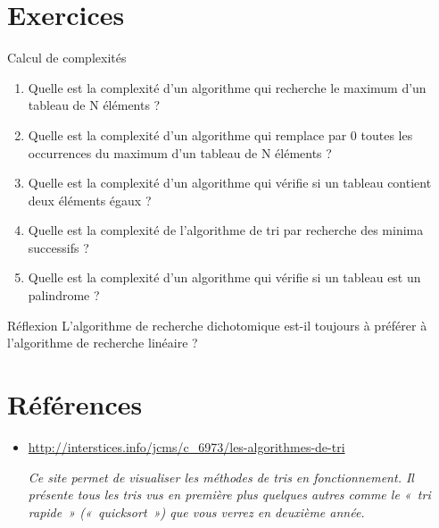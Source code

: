 \section{	Exercices}

	\begin{Exercice}{Calcul de complexités}
			
			\begin{enumerate}[label=\alph*)]
				\item 
					Quelle est la complexité d'un algorithme qui recherche
					le maximum d'un tableau de N éléments ?
				\item 
					Quelle est la complexité d'un algorithme qui remplace
					par 0 toutes les occurrences du maximum d'un tableau
					de N éléments ?
				\item 
					Quelle est la complexité d'un algorithme qui vérifie si
					un tableau contient deux éléments égaux ?
				\item 
					Quelle est la complexité de l'algorithme de tri par
					recherche des minima successifs ?
				\item 
					Quelle est la complexité d'un algorithme qui vérifie si
					un tableau est un palindrome ?
			\end{enumerate}
		\end{Exercice}
		
		\begin{Exercice}{Réflexion}
				L’algorithme de recherche dichotomique est-il toujours à préférer à
				l’algorithme de recherche linéaire ?
		\end{Exercice}


\section{Références}

	\liststyleListv
	\begin{itemize}
		\item {
			\url{http://interstices.info/jcms/c_6973/les-algorithmes-de-tri}

			\textit{Ce site permet de visualiser les méthodes de tris en
			fonctionnement. Il présente tous les tris vus en première plus quelques
			autres comme le «~tri rapide~» («~quicksort~») que vous verrez en
			deuxième année. }}
	\end{itemize}
